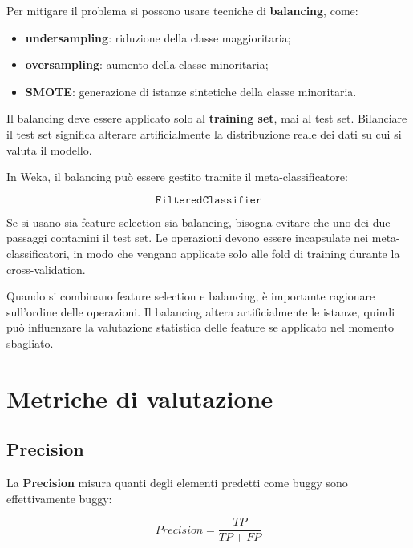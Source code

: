 Per mitigare il problema si possono usare tecniche di \textbf{balancing}, come:

\begin{itemize}
    \item \textbf{undersampling}: riduzione della classe maggioritaria;
    \item \textbf{oversampling}: aumento della classe minoritaria;
    \item \textbf{SMOTE}: generazione di istanze sintetiche della classe minoritaria.
\end{itemize}

\begin{notaesame}
Il balancing deve essere applicato solo al \textbf{training set}, mai al test set. Bilanciare il test set significa alterare artificialmente la distribuzione reale dei dati su cui si valuta il modello.
\end{notaesame}

In Weka, il balancing può essere gestito tramite il meta-classificatore:

\[
\texttt{FilteredClassifier}
\]

\begin{notaesame}
Se si usano sia feature selection sia balancing, bisogna evitare che uno dei due passaggi contamini il test set. Le operazioni devono essere incapsulate nei meta-classificatori, in modo che vengano applicate solo alle fold di training durante la cross-validation.
\end{notaesame}

\begin{notaprof}
Quando si combinano feature selection e balancing, è importante ragionare sull'ordine delle operazioni. Il balancing altera artificialmente le istanze, quindi può influenzare la valutazione statistica delle feature se applicato nel momento sbagliato.
\end{notaprof}

\section{Metriche di valutazione}

\subsection{Precision}

La \textbf{Precision} misura quanti degli elementi predetti come buggy sono effettivamente buggy:

\[
Precision = \frac{TP}{TP + FP}
\]

